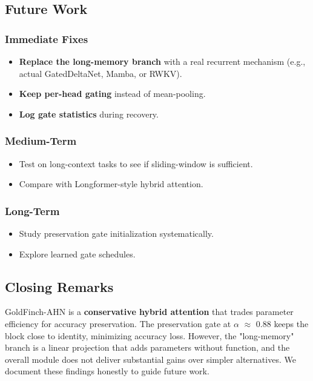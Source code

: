 \subsection{Future Work}

\subsubsection{Immediate Fixes}

\begin{itemize}
\item \textbf{Replace the long-memory branch} with a real recurrent mechanism (e.g.,
  actual GatedDeltaNet, Mamba, or RWKV).
\item \textbf{Keep per-head gating} instead of mean-pooling.
\item \textbf{Log gate statistics} during recovery.

\end{itemize}
\subsubsection{Medium-Term}

\begin{itemize}
\item Test on long-context tasks to see if sliding-window is sufficient.
\item Compare with Longformer-style hybrid attention.

\end{itemize}
\subsubsection{Long-Term}

\begin{itemize}
\item Study preservation gate initialization systematically.
\item Explore learned gate schedules.

\end{itemize}
\subsection{Closing Remarks}

GoldFinch-AHN is a \textbf{conservative hybrid attention} that trades parameter 
efficiency for accuracy preservation. The preservation gate at $\alpha$ $\approx$ 0.88 
keeps the block close to identity, minimizing accuracy loss. However, the 
"long-memory" branch is a linear projection that adds parameters without 
function, and the overall module does not deliver substantial gains over 
simpler alternatives. We document these findings honestly to guide future 
work.

